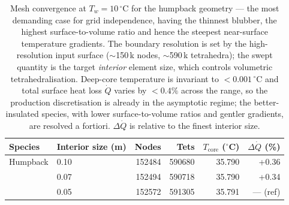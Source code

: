 \begin{table}[htbp]
\centering
\caption{Mesh convergence at $T_w=10\,^\circ$C for the humpback geometry --- the most demanding case for grid independence, having the thinnest blubber, the highest surface-to-volume ratio and hence the steepest near-surface temperature gradients. The boundary resolution is set by the high-resolution input surface ($\sim$150\,k nodes, $\sim$590\,k tetrahedra); the swept quantity is the target \emph{interior} element size, which controls volumetric tetrahedralisation. Deep-core temperature is invariant to $<0.001\,^\circ$C and total surface heat loss $\dot{Q}$ varies by $<0.4\%$ across the range, so the production discretisation is already in the asymptotic regime; the better-insulated species, with lower surface-to-volume ratios and gentler gradients, are resolved a fortiori. $\Delta\dot{Q}$ is relative to the finest interior size.}
\label{tab:mesh_convergence}
\begin{tabular}{llrrrr}
\hline
Species & Interior size (m) & Nodes & Tets & $T_{\mathrm{core}}$ ($^\circ$C) & $\Delta\dot{Q}$ (\%) \\
\hline
Humpback & 0.10 & 152484 & 590680 & 35.790 & +0.36 \\
 & 0.07 & 152494 & 590718 & 35.790 & +0.34 \\
 & 0.05 & 152572 & 591305 & 35.791 & --- (ref) \\
\hline
\end{tabular}
\end{table}
